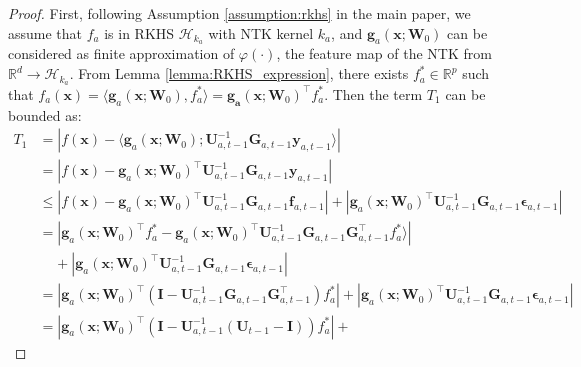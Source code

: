 \begin{proof}
First, following Assumption \ref{assumption:rkhs} in the main paper, we assume that $f_a$ is in RKHS $\mathcal{H}_{k_a}$ with NTK kernel $k_a$, and $\mathbf{g}_a(\mathbf{x}; \mathbf{W}_0)$  can be considered as finite approximation of $\varphi(\cdot)$, the feature map of the NTK from $\mathbb{R}^d \rightarrow \mathcal{H}_{k_a}$. From Lemma \ref{lemma:RKHS_expression}, there exists $f_a^* \in \mathbb{R}^p$ such that $f_a(\mathbf{x}) = \langle \mathbf{g}_a(\mathbf{x}; \mathbf{W}_0), f_a^* \rangle = \mathbf{g_a}(\mathbf{x}; \mathbf{W}_0)^\top f_a^*$. 
Then the term $T_1$ can be bounded as:
\begin{align*}
\label{ieqn:neural_cbo_confidence_interval}
         T_1 &= \left \lvert f(\mathbf{x}) - \langle \mathbf{g}_a(\mathbf{x}; \mathbf{W}_0); \mathbf{U}^{-1}_{a,t-1} \mathbf{G}_{a,t-1} \mathbf{y}_{a,t-1} \rangle   \right \rvert  
         \\
         & = \left\lvert f(\mathbf{x}) - \mathbf{g}_a(\mathbf{x}; \mathbf{W}_0)^\top  \mathbf{U}^{-1}_{a,t-1} \mathbf{G}_{a,t-1} \mathbf{y}_{a,t-1} \right\rvert 
         \\
        & \leq \left\lvert f(\mathbf{x}) - \mathbf{g}_a(\mathbf{x}; \mathbf{W}_0)^\top  \mathbf{U}^{-1}_{a,t-1}
        \mathbf{G}_{a,t-1}\mathbf{f}_{a, t-1} \right\rvert + 
        \left\lvert \mathbf{g}_a(\mathbf{x}; \mathbf{W}_0)^\top \mathbf{U}^{-1}_{a,t-1}
        \mathbf{G}_{a,t-1} \boldsymbol{\epsilon}_{a, t-1} \right\rvert
        \\
        & = \left\lvert \mathbf{g}_a(\mathbf{x}; \mathbf{W}_0)^\top f_a^* - \mathbf{g}_a(\mathbf{x}; \mathbf{W}_0)^\top  \mathbf{U}^{-1}_{a,t-1} 
        \mathbf{G}_{a,t-1}
        \mathbf{G}_{a,t-1}^\top f_a^* \rangle \right\rvert \\
        & \;\;\;\; + 
        \left\rvert  \mathbf{g}_a(\mathbf{x}; \mathbf{W}_0)^\top \mathbf{U}^{-1}_{a,t-1} \mathbf{G}_{a,t-1} \boldsymbol{\epsilon}_{a, t-1}  \right\rvert
        \\
        & = \left\lvert \mathbf{g}_a(\mathbf{x}; \mathbf{W}_0)^\top \left( \mathbf{I} -  \mathbf{U}^{-1}_{a,t-1}  \mathbf{G}_{a,t-1} \mathbf{G}_{a,t-1}^\top  \right) f_a^*  \right \vert + 
        \left\lvert  \mathbf{g}_a(\mathbf{x}; \mathbf{W}_0)^\top \mathbf{U}^{-1}_{a,t-1} \mathbf{G}_{a,t-1} \boldsymbol{\epsilon}_{a, t-1}  \right\rvert 
        \\
        & = \left\lvert \mathbf{g}_a(\mathbf{x}; \mathbf{W}_0)^\top \left( \mathbf{I} -  \mathbf{U}^{-1}_{a,t-1} \left( \mathbf{U}_{t-1} - \mathbf{I} \right)  \right) f_a^*  \right \vert +

\end{align*}
\end{proof}
